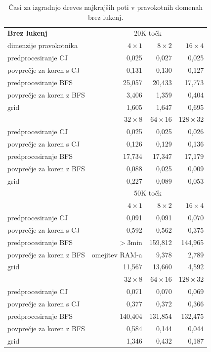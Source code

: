 \documentclass[a4paper, 12pt]{book}
\begin{document}
\begin{table}[htp]
\begin{center}
\begin{tabular}{l*{3}{r}}
\textbf{Brez lukenj} & \multicolumn{3}{c}{20K točk}\\						
dimenzije pravokotnika	&	$4\times 1$	&	$8\times 2$	&	$16\times 4$ \\
\hline
predprocesiranje CJ	&	0,025	&	0,027	&	0,025		\\
povprečje za koren s CJ	&	0,131	&	0,130	&	0,127		\\
predprocesiranje BFS 	&	25,057	&	20,433	&	17,773		\\
povprečje za koren z BFS	&	3,406	&	1,359	&	0,404		\\
grid	&	1,605	&	1,647	&	0,695	\vspace{.2cm}	\\

&	$32\times 8$	&	$64\times 16$	&	$128\times 32$	\\
\hline
predprocesiranje CJ &	0,025	&	0,025	&	0,026 \\
povprečje za koren s CJ &	0,126	&	0,129	&	0,136 \\
predprocesiranje BFS &	17,734	&	17,347	&	17,179 \\
povprečje za koren z BFS &	0,088	&	0,025	&	0,009 \\
grid &	0,227	&	0,089	&	0,053 \vspace{.2cm} \\
\hline
  & \multicolumn{3}{c}{50K točk}  \\						
&	$4\times 1$	&	$8\times 2$	&	$16\times 4$ \\
\hline
predprocesiranje CJ	&	0,091	&	0,091	&	0,070		\\
povprečje za koren s CJ	&	0,592	&	0,562	&	0,375		\\
predprocesiranje BFS	&	$>$3min	&	159,812	&	144,965		\\
povprečje za koren z BFS	& omejitev RAM-a & 9,378	&	2,789		\\
grid				&	11,567	&	13,660	&	4,592	\\

&	$32\times 8$	&	$64\times 16$	&	$128\times 32$	\\
\hline
predprocesiranje CJ &	0,071	&	0,070	&	0,069 \\
povprečje za koren s CJ &	0,377	&	0,372	&	0,366 \\
predprocesiranje BFS &	140,404	&	131,854	&	132,475 \\
povprečje za koren z BFS &	0,584	&	0,144	&	0,044 \\
grid &	1,346	&	0,432	&	0,187
\end{tabular}
\caption{Časi za izgradnjo dreves najkrajših poti v pravokotnih domenah brez lukenj.}
\label{table1}
\end{center}
\end{table}
\end{document}
